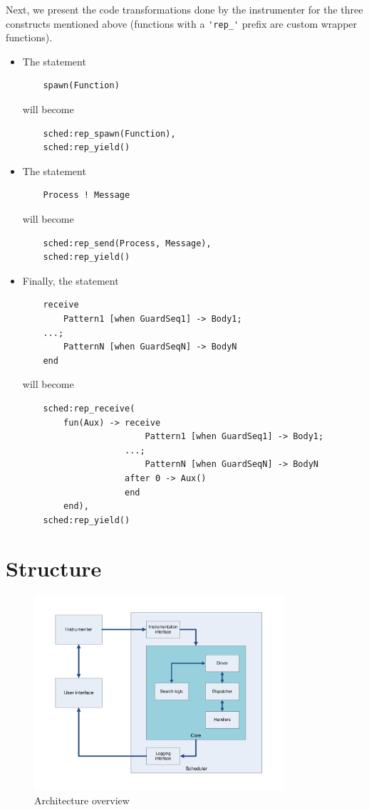 \documentclass[a4paper,10pt]{article}
\begin{document}
Next, we present the code transformations done by the instrumenter for the three constructs mentioned above
(functions with a \lstinline+'rep_'+ prefix are custom wrapper functions).

\begin{itemize}
	\item The statement
	\begin{lstlisting}
    spawn(Function)
	\end{lstlisting}
	will become
	\begin{lstlisting}
    sched:rep_spawn(Function),
    sched:rep_yield()
	\end{lstlisting}
	
	\item The statement
	\begin{lstlisting}
    Process ! Message
	\end{lstlisting}
	will become
	\begin{lstlisting}
    sched:rep_send(Process, Message),
    sched:rep_yield()
	\end{lstlisting}
	
	\item Finally, the statement
	\begin{lstlisting}
    receive
        Pattern1 [when GuardSeq1] -> Body1;
    ...;
        PatternN [when GuardSeqN] -> BodyN
    end
	\end{lstlisting}
	will become
	\begin{lstlisting}
    sched:rep_receive(
        fun(Aux) -> receive
                        Pattern1 [when GuardSeq1] -> Body1;
                    ...;
                        PatternN [when GuardSeqN] -> BodyN
                    after 0 -> Aux()
                    end
        end),
    sched:rep_yield()
	\end{lstlisting}
\end{itemize}

\section{Structure}

\begin{figure}[htb]
	\centering
	\includegraphics[width=350px]{pra1_arch}
	\caption{Architecture overview}
\end{figure}
\end{document}
